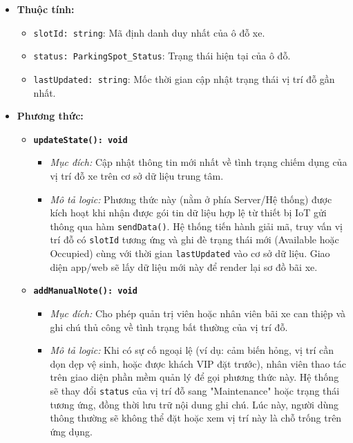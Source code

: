 \begin{itemize}
    \item \textbf{Thuộc tính:}
    \begin{itemize}
        \item \texttt{slotId: string}: Mã định danh duy nhất của ô đỗ xe.
        \item \texttt{status: ParkingSpot\_Status}: Trạng thái hiện tại của ô đỗ.
        \item \texttt{lastUpdated: string}: Mốc thời gian cập nhật trạng thái vị trí đỗ gần nhất.
    \end{itemize}
    
    \item \textbf{Phương thức:}
    \begin{itemize}
        \item \textbf{\texttt{updateState(): void}}
        \begin{itemize}
            \item \textit{Mục đích:} Cập nhật thông tin mới nhất về tình trạng chiếm dụng của vị trí đỗ xe trên cơ sở dữ liệu trung tâm.
            \item \textit{Mô tả logic:} Phương thức này (nằm ở phía Server/Hệ thống) được kích hoạt khi nhận được gói tin dữ liệu hợp lệ từ thiết bị IoT gửi thông qua hàm \texttt{sendData()}. Hệ thống tiến hành giải mã, truy vấn vị trí đỗ có \texttt{slotId} tương ứng và ghi đè trạng thái mới (Available hoặc Occupied) cùng với thời gian \texttt{lastUpdated} vào cơ sở dữ liệu. Giao diện app/web sẽ lấy dữ liệu mới này để render lại sơ đồ bãi xe.
        \end{itemize}

        \item \textbf{\texttt{addManualNote(): void}}
        \begin{itemize}
            \item \textit{Mục đích:} Cho phép quản trị viên hoặc nhân viên bãi xe can thiệp và ghi chú thủ công về tình trạng bất thường của vị trí đỗ.
            \item \textit{Mô tả logic:} Khi có sự cố ngoại lệ (ví dụ: cảm biến hỏng, vị trí cần dọn dẹp vệ sinh, hoặc được khách VIP đặt trước), nhân viên thao tác trên giao diện phần mềm quản lý để gọi phương thức này. Hệ thống sẽ thay đổi \texttt{status} của vị trí đỗ sang "Maintenance" hoặc trạng thái tương ứng, đồng thời lưu trữ nội dung ghi chú. Lúc này, người dùng thông thường sẽ không thể đặt hoặc xem vị trí này là chỗ trống trên ứng dụng.
        \end{itemize}
    \end{itemize}
\end{itemize}

